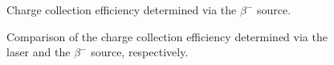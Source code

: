 \begin{figure}[H]
	\centering
	\caption{Charge collection efficiency determined via the $\beta^{-}$ source.}
	\label{fig:beta}
\end{figure}

\begin{figure}[H]
	\centering
	\caption{Comparison of the charge collection efficiency determined via the laser and
the $\beta^{-}$ source, respectively.}
	\label{fig:betalaser}
\end{figure}
